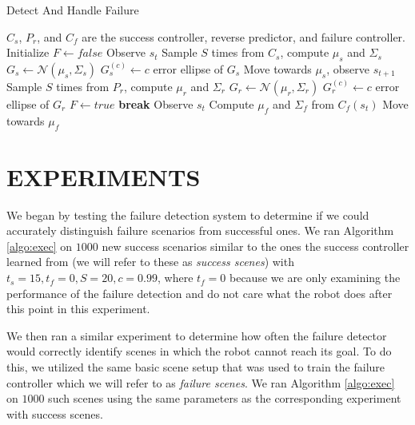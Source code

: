 \documentclass[letterpaper, 10 pt, conference]{ieeeconf}  %
\begin{document}
		\begin{algorithm}
			\caption{Detect And Handle Failure}
			\label{algo:exec}
			\begin{algorithmic}
			    \State $C_s$, $P_r$, and $C_f$ are the success controller, reverse predictor, and failure controller.
					\State Initialize $F\leftarrow false$
						\State Observe $s_t$
						\State Sample $S$ times from $C_s$, compute $\mu_s$ and $\Sigma_s$
						\State $G_s \leftarrow \mathcal{N}(\mu_s, \Sigma_s)$
						\State $G_s^{(c)}\leftarrow c$ error ellipse of $G_s$
						\State Move towards $\mu_s$, observe $s_{t+1}$
						\State Sample $S$ times from $P_r$, compute $\mu_r$ and $\Sigma_r$
						\State $G_r \leftarrow \mathcal{N}(\mu_r, \Sigma_r)$
						\State $G_r^{(c)}\leftarrow c$ error ellipse of $G_r$
							\State $F\leftarrow true$
							\State \textbf{break}
						\EndIf
					\EndFor
							\State Observe $s_t$
							\State Compute $\mu_f$ and $\Sigma_f$ from $C_f(s_t)$
							\State Move towards $\mu_f$
						\EndFor
					\EndIf
				\EndFunction
			\end{algorithmic}
		\end{algorithm}
		
\section{EXPERIMENTS}\label{sec:experiments}
	We began by testing the failure detection system to determine if we could accurately distinguish failure scenarios from successful ones. We ran Algorithm \ref{algo:exec} on $1000$ new success scenarios similar to the ones the success controller learned from (we will refer to these as \textit{success scenes}) with $t_s=15, t_f=0, S=20, c=0.99$, where $t_f=0$ because we are only examining the performance of the failure detection and do not care what the robot does after this point in this experiment. 
	
	We then ran a similar experiment to determine how often the failure detector would correctly identify scenes in which the robot cannot reach its goal. To do this, we utilized the same basic scene setup that was used to train the failure controller which we will refer to as \textit{failure scenes}. We ran Algorithm \ref{algo:exec} on $1000$ such scenes using the same parameters as the corresponding experiment with success scenes.
\end{document}
